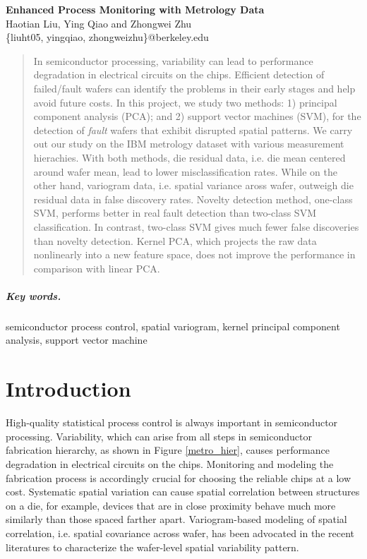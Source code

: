 \documentclass[english]{article}
\numberwithin{equation}{section}
\numberwithin{table}{section}
\numberwithin{figure}{section}
\begin{document}
\begin{center}
\textbf{\Large Enhanced Process Monitoring with Metrology Data} \\[6pt]
  Haotian Liu, Ying Qiao and Zhongwei Zhu \\[6pt]
  \{liuht05, yingqiao, zhongweizhu\}@berkeley.edu
\end{center}

\begin{abstract}
In semiconductor processing, variability can lead to
performance degradation in electrical circuits on the chips. Efficient
detection of failed/fault wafers can identify the problems in their
early stages and help avoid future costs. In this project, we study
two methods: 1) principal component analysis (PCA); and 2) support
vector machines (SVM), for the detection of \emph{fault} wafers that
exhibit disrupted spatial patterns. We carry out our study on the
IBM metrology dataset with various measurement hierachies. 
With both methods, die residual data, i.e. die mean centered around wafer mean, lead to
lower misclassification rates. While on the other hand, variogram
data, i.e. spatial variance aross wafer, outweigh die
residual data in false discovery rates. Novelty detection method,
one-class SVM, performs better in real fault detection than two-class
SVM classification.
In contrast, two-class SVM gives much fewer false discoveries than
novelty detection. Kernel PCA, which projects the raw data nonlinearly
into a new feature space, does not improve the performance in comparison
with linear PCA.
\end{abstract}

\subparagraph{Key words.} semiconductor process control, spatial
variogram, kernel principal component analysis, support vector machine


\section{Introduction}

\hspace{12 pt}
High-quality statistical process control is always important in
semiconductor processing\cite{DAC09}. Variability, which can arise from all steps in
semiconductor fabrication hierarchy, as shown in Figure \ref{metro_hier},
causes performance degradation 
in electrical circuits on the chips. Monitoring and modeling the
fabrication process is accordingly crucial for choosing the reliable 
chips at a low cost. Systematic spatial variation can cause spatial
correlation between structures on a die, for example, devices that are
in close proximity behave much more similarly than those spaced
farther apart\cite{KedarPHD}. Variogram-based modeling of spatial
correlation, i.e. spatial covariance across wafer, has been advocated in the recent literatures to
characterize the wafer-level spatial variability pattern. 
\end{document}
